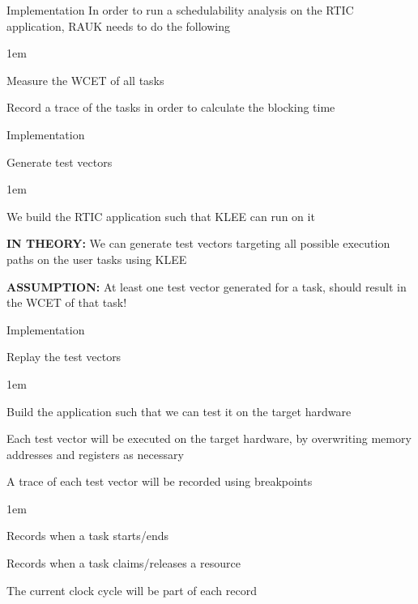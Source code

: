 \begin{frame}{Implementation}
    In order to run a schedulability analysis on the RTIC application,
    RAUK needs to do the following
    \vspace{1em}
    \begin{itemize-size}{1em}
        \item Measure the WCET of all tasks
        \item Record a trace of the tasks in order to
        calculate the blocking time
    \end{itemize-size}     
\end{frame}

\begin{frame}{Implementation}
    \begin{block}{Generate test vectors}
        \begin{itemize-size}{1em}
            \item We build the RTIC application such that KLEE can run on it
            \item \textbf{IN THEORY:} We can generate test vectors targeting all possible
            execution paths on the user tasks using KLEE
            \item \textbf{ASSUMPTION:} At least one test vector generated for a task, should
            result in the WCET of that task!
        \end{itemize-size}  
    \end{block}
\end{frame}

\begin{frame}{Implementation}
    \begin{block}{Replay the test vectors}
        \begin{itemize-size}{1em}
            \item Build the application such that we can test it on the target hardware
            \item Each test vector will be executed on the target hardware, by overwriting
            memory addresses and registers as necessary
            \item A trace of each test vector will be recorded using breakpoints
            \begin{itemize-size}{1em}
                \vspace{0.5em}
                \item Records when a task starts/ends
                \item Records when a task claims/releases a resource
                \item The current clock cycle will be part of each record
            \end{itemize-size}
        \end{itemize-size}  
    \end{block}
\end{frame}

